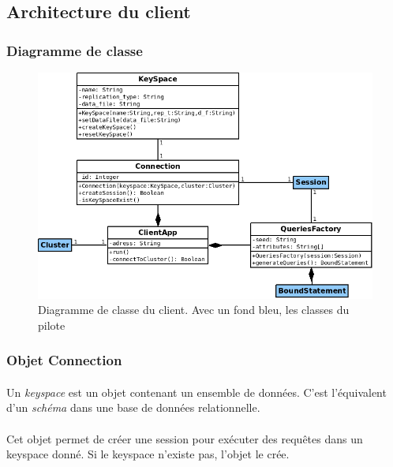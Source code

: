 \documentclass[12pt]{article}
\begin{document}
\subsection{Architecture du client}

\subsubsection{Diagramme de classe}

\begin{figure}[H]
	\centering
		\includegraphics[width=15cm]{schemas/umlclient.png}
	\caption{Diagramme de classe du client. Avec un fond bleu, les classes du pilote \label{fig:umlclient}}
\end{figure}

\subsubsection{ Objet Connection }

\paragraph{} Un \textit{keyspace} est un objet contenant un ensemble de données. C'est l'équivalent d'un \textit{schéma} dans une base de données relationnelle.

\paragraph{} Cet objet permet de créer une session pour exécuter des requêtes dans un keyspace donné.
Si le keyspace n'existe pas, l'objet  le crée.
\end{document}
